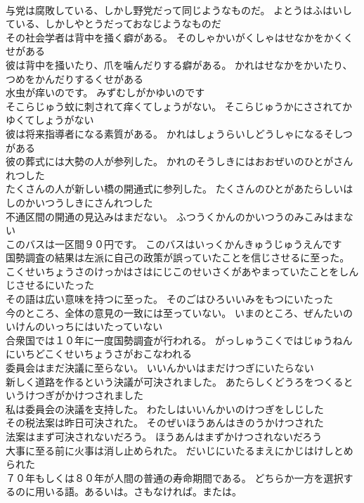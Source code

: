 \documentclass[8pt]{extreport}
\begin{document}
\begin{CJK}{UTF8}{min}
\\	与党は腐敗している、しかし野党だって同じようなものだ。	よとうはふはいしている、しかしやとうだっておなじようなものだ 
\\	その社会学者は背中を掻く癖がある。	そのしゃかいがくしゃはせなかをかくくせがある 
\\	彼は背中を掻いたり、爪を噛んだりする癖がある。	かれはせなかをかいたり、つめをかんだりするくせがある 
\\	水虫が痒いのです。	みずむしがかゆいのです 
\\	そこらじゅう蚊に刺されて痒くてしょうがない。	そこらじゅうかにさされてかゆくてしょうがない 
\\	彼は将来指導者になる素質がある。	かれはしょうらいしどうしゃになるそしつがある 
\\	彼の葬式には大勢の人が参列した。	かれのそうしきにはおおぜいのひとがさんれつした 
\\	たくさんの人が新しい橋の開通式に参列した。	たくさんのひとがあたらしいはしのかいつうしきにさんれつした 
\\	不通区間の開通の見込みはまだない。	ふつうくかんのかいつうのみこみはまない 
\\	このバスは一区間９０円です。	このバスはいっくかんきゅうじゅうえんです 
\\	国勢調査の結果は左派に自己の政策が誤っていたことを信じさせるに至った。	こくせいちょうさのけっかはさはにじこのせいさくがあやまっていたことをしんじさせるにいたった 
\\	その語は広い意味を持つに至った。	そのごはひろいいみをもつにいたった 
\\	今のところ、全体の意見の一致には至っていない。	いまのところ、ぜんたいのいけんのいっちにはいたっていない 
\\	合衆国では１０年に一度国勢調査が行われる。	がっしゅうこくではじゅうねんにいちどこくせいちょうさがおこなわれる 
\\	委員会はまだ決議に至らない。	いいんかいはまだけつぎにいたらない 
\\	新しく道路を作るという決議が可決されました。	あたらしくどうろをつくるというけつぎがかけつされました 
\\	私は委員会の決議を支持した。	わたしはいいんかいのけつぎをしじした 
\\	その税法案は昨日可決された。	そのぜいほうあんはきのうかけつされた 
\\	法案はまず可決されないだろう。	ほうあんはまずかけつされないだろう 
\\	大事に至る前に火事は消し止められた。	だいじにいたるまえにかじはけしとめられた 
\\	７０年もしくは８０年が人間の普通の寿命期間である。	どちらか一方を選択するのに用いる語。あるいは。さもなければ。または。

\end{CJK}
\end{document}
